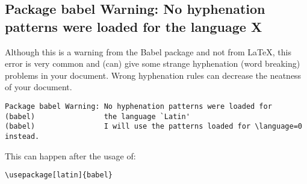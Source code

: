\subsection{Package babel Warning: No hyphenation patterns were loaded for the language X}
Although this is a warning from the Babel package and not from LaTeX, this
error is very common and (can) give some strange hyphenation (word breaking)
problems in your document. Wrong hyphenation rules can decrease the neatness of
your document.
\begin{verbatim}
Package babel Warning: No hyphenation patterns were loaded for
(babel)                the language `Latin'
(babel)                I will use the patterns loaded for \language=0 instead.
\end{verbatim}

This can happen after the usage of: 
\begin{lstlisting}
\usepackage[latin]{babel}
\end{lstlisting}

